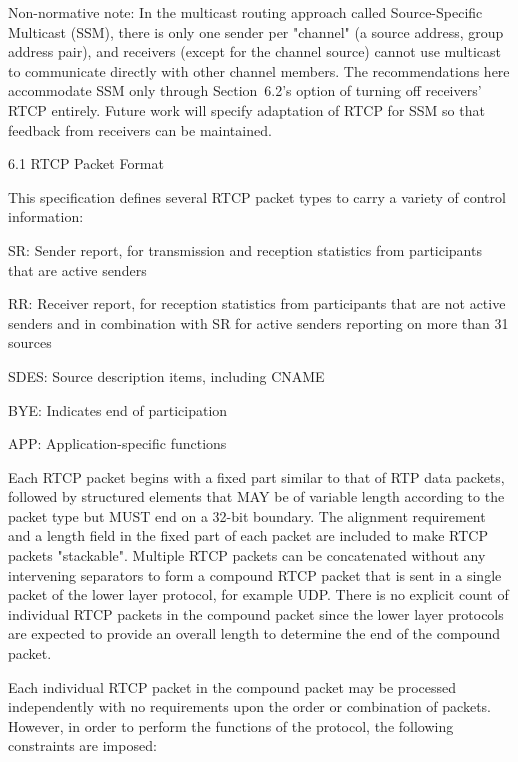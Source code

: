 \documentclass{article}
\begin{document}
Non-normative note:  In the multicast routing approach called Source-Specific Multicast (SSM), there is only one sender per "channel" (a source address, group address pair), and receivers (except for the channel source) cannot use multicast to communicate directly with other channel members.  The recommendations here accommodate SSM only through Section~6.2's option of turning off receivers' RTCP entirely.  Future work will specify adaptation of RTCP for SSM so that feedback from receivers can be maintained.

6.1 RTCP Packet Format

This specification defines several RTCP packet types to carry a variety of control information:

SR:   Sender report, for transmission and reception statistics from participants that are active senders

RR:   Receiver report, for reception statistics from participants that are not active senders and in combination with SR for active senders reporting on more than 31 sources

SDES: Source description items, including CNAME

BYE:  Indicates end of participation

APP:  Application-specific functions

Each RTCP packet begins with a fixed part similar to that of RTP data packets, followed by structured elements that MAY be of variable length according to the packet type but MUST end on a 32-bit boundary.  The alignment requirement and a length field in the fixed part of each packet are included to make RTCP packets "stackable". Multiple RTCP packets can be concatenated without any intervening separators to form a compound RTCP packet that is sent in a single packet of the lower layer protocol, for example UDP.  There is no explicit count of individual RTCP packets in the compound packet since the lower layer protocols are expected to provide an overall length to determine the end of the compound packet.

Each individual RTCP packet in the compound packet may be processed independently with no requirements upon the order or combination of packets.  However, in order to perform the functions of the protocol, the following constraints are imposed:
\end{document}
